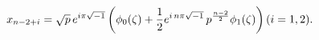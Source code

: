 \begin{equation}
x_{n-2+i}=\sqrt{p}\,e^{i\pi\sqrt{-1}}\left(\phi_{0}(\zeta)+\frac{1}{2}e^{i\,n\pi\sqrt{-1}}\,p^{\frac{n-2}{2}}\phi_{1}(\zeta)\right)\\\\
\\ (i=1,2).\label{sol2}
\end{equation}

